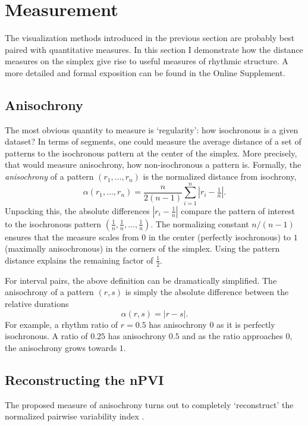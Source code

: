 \documentclass{tMAM2e}%
\theoremstyle{plain}
\theoremstyle{definition}
\theoremstyle{remark}
\begin{document}
\section{Measurement}%
\label{sec:measurement}


The visualization methods introduced in the previous section are probably best paired with quantitative measures. 
In this section I demonstrate how the distance measures on the simplex give rise to useful measures of rhythmic structure. 
A more detailed and formal exposition can be found in the Online Supplement.


\subsection{Anisochrony}
The most obvious quantity to measure is ‘regularity’: how isochronous is a given dataset? In terms of segments, one could measure the average distance of a set of patterns to the isochronous pattern at the center of the simplex. 
More precisely, that would measure anisochrony, how non-isochronous a pattern is. 
Formally, the \emph{anisochrony} of a pattern $(r_1, \dots, r_n)$ is the normalized distance from isochrony,
\[
\alpha(r_1, \dots, r_n) 
  = \frac{n}{2(n-1)} \sum_{i=1}^n \left|r_i - \tfrac{1}{n}\right|.
\]
Unpacking this, the absolute differences $|r_i - \frac{1}{n}|$ compare the pattern of interest to the isochronous pattern $(\tfrac{1}{n}, \tfrac{1}{n}, \dots, \tfrac{1}{n})$. 
The normalizing constant $n / (n - 1)$ ensures that the measure scales from $0$ in the center (perfectly isochronous) to $1$ (maximally anisochronous) in the corners of the simplex. 
Using the pattern distance explains the remaining factor of $\tfrac{1}{2}$. 

For interval pairs, the above definition can be dramatically simplified. 
The anisochrony of a pattern $(r, s)$ is simply the absolute difference between the relative durations
\[
  \alpha(r, s) = |r-s|.
\]
For example, a rhythm ratio of $r = 0.5$ has anisochrony $0$ as it is perfectly isochronous. 
A ratio of $0.25$ has anisochrony $0.5$ and as the ratio approaches $0$, the anisochrony grows towards $1$.


\subsection{Reconstructing the nPVI}
The proposed measure of anisochrony turns out to completely ‘reconstruct’ the normalized pairwise variability index \citep{Low2000LangSpeech}. 
\end{document}
